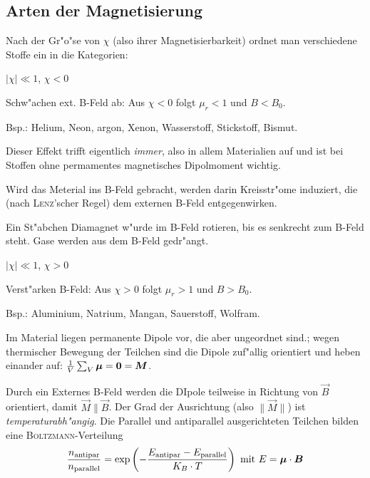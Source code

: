 \subsection{Arten der Magnetisierung}
\label{kap_arten-magnetisierung}

Nach der Gr"o"se von $\chi$ (also ihrer Magnetisierbarkeit) ordnet man
verschiedene Stoffe ein in die Kategorien:
\begin{description}[\setlabelstyle{\bfseries\slshape}]
\item[Diamagnetische Stoffe] $|\chi| \ll 1$, $\chi < 0$

Schw"achen ext. B-Feld ab: Aus $\chi < 0$ folgt $\mu_r < 1$ und $B < B_0$.

Bsp.: Helium, Neon, argon, Xenon, Wasserstoff, Stickstoff, Bismut.

\bigskip

Dieser Effekt trifft eigentlich \emph{immer}, also in allem
Materialien auf und ist bei Stoffen ohne permamentes magnetisches
Dipolmoment wichtig.

Wird das Meterial ins B-Feld gebracht, werden darin Kreisstr"ome
induziert, die (nach \textsc{Lenz}'scher Regel) dem externen B-Feld
entgegenwirken.

Ein St"abchen Diamagnet w"urde im B-Feld rotieren, bis es senkrecht zum
B-Feld steht. Gase werden aus dem B-Feld gedr"angt.
\item[Paramagnetische Stoffe]  $|\chi| \ll 1$, $\chi > 0$

Verst"arken B-Feld: Aus $\chi > 0$ folgt $\mu_r > 1$ und $B > B_0$.

Bsp.: Aluminium, Natrium, Mangan, Sauerstoff, Wolfram.


\bigskip

Im Material liegen permanente Dipole vor, die aber ungeordnet sind.;
wegen thermischer Bewegung der Teilchen sind die Dipole zuf"allig
orientiert und heben einander auf: $\frac{1}{V}\sum_V \boldsymbol{\mu} = \boldsymbol{0} = \boldsymbol{M}$.

Durch ein Externes B-Feld werden die DIpole teilweise in Richtung von
$\vec B$ orientiert, damit $\vec M \| \vec B$. Der Grad der
Ausrichtung (also $\|\vec M\|$) ist \emph{temperaturabh"angig}. Die
Parallel und antiparallel ausgerichteten Teilchen bilden eine
\textsc{Boltzmann}-Verteilung
\begin{equation}
   \label{eq:382}
   \frac{n_\text{antipar}}{n_\text{parallel}} = \exp \left ( -
      \frac{E_\text{antipar} - E_\text{parallel}}{K_B \cdot T} \right
   ) \text{ mit } E = \boldsymbol{\mu} \cdot \boldsymbol{B}
\end{equation}


\end{description}
